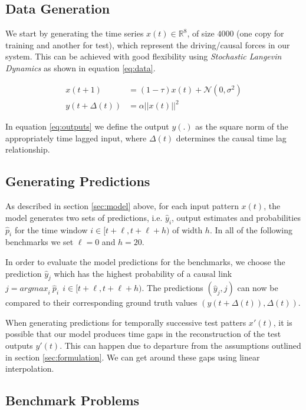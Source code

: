 \documentclass[envcountsect,runningheads]{llncs}
\theoremstyle{etoile}
\begin{document}
\subsection{Data Generation}

We start by generating the time series $x(t) \in \mathbb{R}^8$, of size $4000$ 
(one copy for training and another for test), which represent the driving/causal forces in our system. 
This can be achieved with good flexibility using \emph{Stochastic Langevin Dynamics} as shown in 
equation \ref{eq:data}.

\begin{align}
 x(t+1) &= (1 - \tau) x(t) + \mathcal{N}(0, \sigma^2) \label{eq:data}\\
 y(t+\Delta(t)) &= \alpha ||x(t)||^2 \label{eq:outputs}
\end{align}

In equation \ref{eq:outputs} we define the output $y(.)$ as the square norm of the appropriately 
time lagged input, where $\Delta(t)$ determines the causal time lag relationship.

\subsection{Generating Predictions}

As described in section \ref{sec:model} above, for each input pattern $x(t)$, the model 
generates two sets of predictions, i.e. ${\hat{y}_i}$, output estimates and probabilities $\hat{p}_i$ 
for the time window $i \in [t+\ell, t+\ell+h)$ of width $h$. In all of the following benchmarks we set 
$\ell = 0$ and $h = 20$.

In order to evaluate the model predictions for the benchmarks, we choose the prediction $\hat{y}_j$ 
which has the highest probability of a causal link $j = {argmax}_{i} \ \hat{p}_i \ \ i \in [t+\ell, t+\ell+h)$. 
The predictions $(\hat{y}_j, j)$ can now be compared to their corresponding ground truth values 
$(y(t + \Delta(t)), \Delta(t))$. 

When generating predictions for temporally successive test patters $x'(t)$, it is possible that our 
model produces time gaps in the reconstruction of the test outputs $y'(t)$. This can happen due to 
departure from the assumptions outlined in section \ref{sec:formulation}. We can get around these 
gaps using linear interpolation.


\subsection{Benchmark Problems}\label{sec:benchmark}
\end{document}
